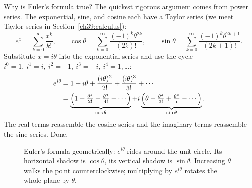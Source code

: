 Why is Euler's formula true? The quickest rigorous argument comes from power series. The exponential,
sine, and cosine each have a Taylor series (we meet Taylor series in Section~\ref{ch39:calculus}):
\[
e^x = \sum_{k=0}^{\infty}\frac{x^k}{k!},\qquad
\cos\theta = \sum_{k=0}^{\infty}\frac{(-1)^k\theta^{2k}}{(2k)!},\qquad
\sin\theta = \sum_{k=0}^{\infty}\frac{(-1)^k\theta^{2k+1}}{(2k+1)!}.
\]
Substitute $x = i\theta$ into the exponential series and use the cycle $i^0=1,\ i^1=i,\ i^2=-1,\
i^3=-i,\ i^4 = 1,\dots$:
\begin{align*}
e^{i\theta} &= 1 + i\theta + \frac{(i\theta)^2}{2!} + \frac{(i\theta)^3}{3!} + \cdots \\
&= \underbrace{\Bigl(1 - \tfrac{\theta^2}{2!} + \tfrac{\theta^4}{4!} - \cdots\Bigr)}_{\cos\theta}
+ i\underbrace{\Bigl(\theta - \tfrac{\theta^3}{3!} + \tfrac{\theta^5}{5!} - \cdots\Bigr)}_{\sin\theta}.
\end{align*}
The real terms reassemble the cosine series and the imaginary terms reassemble the sine series. Done.

\begin{figure}[H]
\centering
{}
\caption{Euler's formula geometrically: $e^{i\theta}$ rides around the unit circle. Its horizontal
shadow is $\cos\theta$, its vertical shadow is $\sin\theta$. Increasing $\theta$ walks the point
counterclockwise; multiplying by $e^{i\theta}$ rotates the whole plane by $\theta$.}
\label{ch39:fig-euler}
\end{figure}

